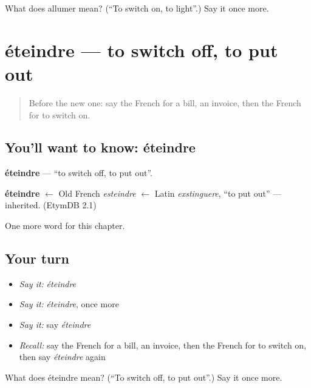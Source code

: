 \begin{tcolorbox}[breakable,colback=teal!4,colframe=teal!35!black,title={Before you move on}]
What does allumer mean? (\textquotedblleft{}To switch on, to light\textquotedblright{}.) Say it once more.
\end{tcolorbox}
\section[éteindre]{éteindre — to switch off, to put out}

\label{lesson:FR-C143-eteindre}



\begin{quote}
Before the new one: say the French for a bill, an invoice, then the French for to switch on.
\end{quote}

\subsection*{You'll want to know: éteindre}
\textbf{éteindre} — \textquotedblleft{}to switch off, to put out\textquotedblright{}.

\begin{cousinweb}
\textbf{éteindre} $\leftarrow$ Old French \emph{esteindre} $\leftarrow$ Latin \emph{exstinguere}, \textquotedblleft{}to put out\textquotedblright{} — inherited. (EtymDB 2.1)
\end{cousinweb}

\begin{grammarlens}[title={What you've built}]
One more word for this chapter.
\end{grammarlens}

\subsection*{Your turn}
\begin{itemize}
\raggedright
  \item \emph{Say it:} \emph{éteindre}
  \item \emph{Say it:} \emph{éteindre}, once more
  \item \emph{Say it:} say \emph{éteindre}
  \item \emph{Recall:} say the French for a bill, an invoice, then the French for to switch on, then say \emph{éteindre} again
\end{itemize}

\begin{tcolorbox}[breakable,colback=teal!4,colframe=teal!35!black,title={Before you move on}]
What does éteindre mean? (\textquotedblleft{}To switch off, to put out\textquotedblright{}.) Say it once more.
\end{tcolorbox}
